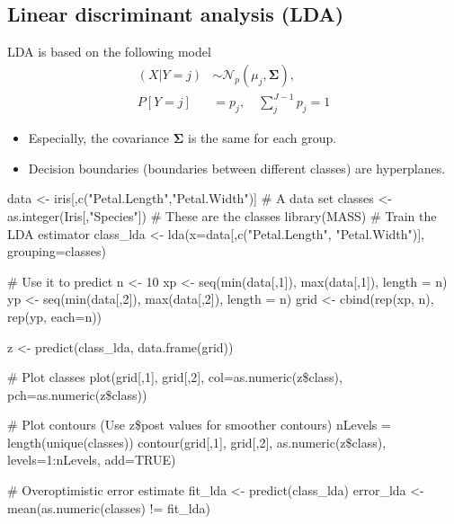 \subsection{Linear discriminant analysis (LDA)}
\begin{theory}
 LDA is based on the following model
 \begin{align*}
  (X|Y=j) & \sim \mathcal{N}_p(\mu_j, \boldsymbol{\Sigma}),\\
  P[Y=j]  & = p_j, \quad \sum_j^{J-1}p_j=1
 \end{align*}
 \begin{itemize}
  \item Especially, the covariance $\boldsymbol{\Sigma}$ is the same for each group.
  \item Decision boundaries (boundaries between different classes) are hyperplanes.
 \end{itemize} 
\end{theory}
\begin{code}
 data <- iris[,c("Petal.Length","Petal.Width")] # A data set
 classes <- as.integer(Iris[,"Species"]) # These are the classes
 library(MASS)
 # Train the LDA estimator
 class_lda <- lda(x=data[,c("Petal.Length", "Petal.Width")], grouping=classes)

 # Use it to predict
 n <- 10
 xp <- seq(min(data[,1]), max(data[,1]), length = n)
 yp <- seq(min(data[,2]), max(data[,2]), length = n)
 grid <- cbind(rep(xp, n), rep(yp, each=n))
 
 z <- predict(class_lda, data.frame(grid))
 
 # Plot classes
 plot(grid[,1], grid[,2], col=as.numeric(z\$class), pch=as.numeric(z\$class))
 
 # Plot contours (Use z\$post values for smoother contours)
 nLevels = length(unique(classes))
 contour(grid[,1], grid[,2], as.numeric(z\$class), levels=1:nLevels, add=TRUE)
 
 # Overoptimistic error estimate
 fit_lda <- predict(class_lda)
 error_lda <- mean(as.numeric(classes) != fit_lda)
\end{code}


